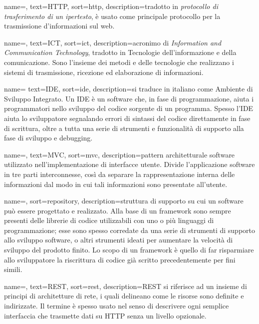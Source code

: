 {
	name=,
	text=HTTP,
	sort=http,
	description={tradotto in \emph{protocollo di trasferimento di un ipertesto}, è usato come principale protocollo per la trasmissione d'informazioni sul web.}
}

{
	name=,
	text=ICT,
	sort=ict,
	description={acronimo di \emph{Information and Communication Technology}, tradotto in Tecnologie dell’informazione e della comunicazione. Sono l'insieme dei metodi e delle tecnologie che realizzano i sistemi di trasmissione, ricezione ed elaborazione di informazioni.}
}

{
	name=
	text=IDE,
	sort=ide,
	description={si traduce in italiano come Ambiente di Sviluppo Integrato. Un IDE è un software che, in fase di programmazione, aiuta i programmatori nello sviluppo del codice sorgente di un programma. Spesso l'IDE aiuta lo sviluppatore segnalando errori di sintassi del codice direttamente in fase di scrittura, oltre a tutta una serie di strumenti e funzionalità di supporto alla fase di sviluppo e debugging.}
}

{
	name=,
	text=MVC,
	sort=mvc,
	description={pattern architetturale software utilizzato nell'implementazione di interfacce utente. Divide l'applicazione software in tre parti interconnesse, così da separare la rappresentazione interna delle informazioni dal modo in cui tali informazioni sono presentate all'utente.}
}

{
	name=,
	sort=repository,
	description={struttura di supporto su cui un software può essere progettato e realizzato. Alla base di un framework sono sempre presenti delle librerie di codice utilizzabili con uno o più linguaggi di programmazione; esse sono spesso corredate da una serie di strumenti di supporto allo sviluppo software, o altri strumenti ideati per aumentare la velocità di sviluppo del prodotto finito. Lo scopo di un framework è quello di far risparmiare allo sviluppatore la riscrittura di codice già scritto precedentemente per fini simili.}
}

{
	name=,
	text=REST,
	sort=rest,
	description={REST si riferisce ad un insieme di principi di architetture di rete, i quali delineano come le risorse sono definite e indirizzate. Il termine è spesso usato nel senso di descrivere ogni semplice interfaccia che trasmette dati su HTTP senza un livello opzionale.}
}

